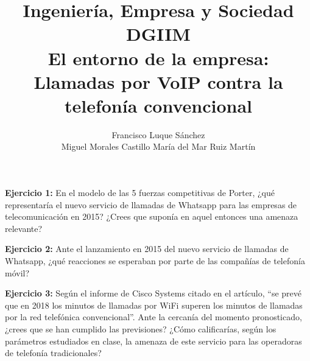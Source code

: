 \documentclass[11pt]{article}
\theoremstyle{plain}
\theoremstyle{definition}
\begin{document}
\title{Ingeniería, Empresa y Sociedad \\
  DGIIM \\
  \large El entorno de la empresa: Llamadas por VoIP contra la
  telefonía convencional }
\author{Francisco Luque Sánchez\\
  Miguel Morales Castillo María del Mar Ruiz Martín}

\maketitle

\textbf{Ejercicio 1:} En el modelo de las 5 fuerzas competitivas de
Porter, ¿qué representaría el nuevo servicio de llamadas de Whatsapp
para las empresas de telecomunicación en 2015? ¿Crees que suponía en
aquel entonces una amenaza relevante?

\textbf{Ejercicio 2:} Ante el lanzamiento en 2015 del nuevo servicio
de llamadas de Whatsapp, ¿qué reacciones se esperaban por parte de las
compañías de telefonía móvil?

\textbf{Ejercicio 3:} Según el informe de Cisco Systems citado en el
artículo, ``se prevé que en 2018 los minutos de llamadas por WiFi
superen los minutos de llamadas por la red telefónica
convencional''. Ante la cercanía del momento pronosticado, ¿crees que
se han cumplido las previsiones? ¿Cómo calificarías, según los
parámetros estudiados en clase, la amenaza de este servicio para las
operadoras de telefonía tradicionales?

\printbibliography
\end{document}
